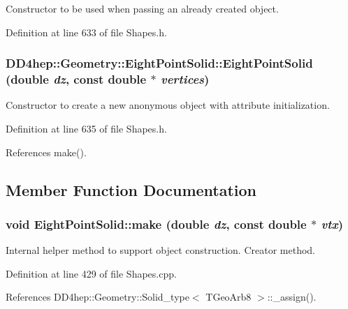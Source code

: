 Constructor to be used when passing an already created object. 

Definition at line 633 of file Shapes.h.\hypertarget{class_d_d4hep_1_1_geometry_1_1_eight_point_solid_a31cadc86111d6b1cfcd6767c33c64f73}{
\subsubsection[{EightPointSolid}]{\setlength{\rightskip}{0pt plus 5cm}DD4hep::Geometry::EightPointSolid::EightPointSolid (double {\em dz}, \/  const double $\ast$ {\em vertices})}}
\label{class_d_d4hep_1_1_geometry_1_1_eight_point_solid_a31cadc86111d6b1cfcd6767c33c64f73}


Constructor to create a new anonymous object with attribute initialization. 

Definition at line 635 of file Shapes.h.

References make().

\subsection{Member Function Documentation}
\hypertarget{class_d_d4hep_1_1_geometry_1_1_eight_point_solid_a037a713544e344700d7f3bd2e29406bb}{
\subsubsection[{make}]{\setlength{\rightskip}{0pt plus 5cm}void EightPointSolid::make (double {\em dz}, \/  const double $\ast$ {\em vtx})}}
\label{class_d_d4hep_1_1_geometry_1_1_eight_point_solid_a037a713544e344700d7f3bd2e29406bb}


Internal helper method to support object construction. Creator method. 

Definition at line 429 of file Shapes.cpp.

References DD4hep::Geometry::Solid\_\-type$<$ TGeoArb8 $>$::\_\-assign().

